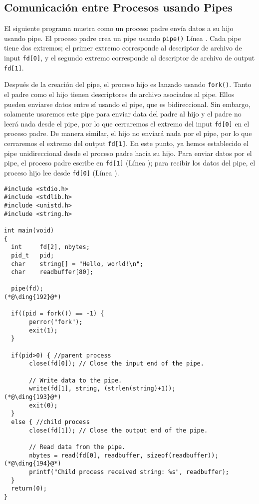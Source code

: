\vspace{0.2in}
\subsection{Comunicación entre Procesos usando Pipes}
\label{vpn:subsec:pipe}

El siguiente programa muetra como un proceso padre envía datos a su hijo usando pipe. El proceso padre crea un pipe usando  \texttt{pipe()} Línea . 
Cada pipe tiene dos extremos; el primer extremo corresponde al descriptor de archivo de input \texttt{fd[0]}, y el segundo extremo corresponde al descriptor de archivo de output \texttt{fd[1]}.

Después de la creación del pipe, el proceso hijo es lanzado usando \texttt{fork()}. 
Tanto el padre como el hijo tienen descriptores de archivo asociados al pipe. Ellos pueden enviarse datos entre sí usando el pipe, que es bidireccional. Sin embargo, solamente usaremos este pipe para enviar data del padre al hijo y el padre no leerá nada desde el pipe, por lo que cerraremos el extremo del input \texttt{fd[0]} en el proceso padre. De manera similar, el hijo no enviará nada por el pipe, por lo que cerraremos el extremo del output \texttt{fd[1]}. 
En este punto, ya hemos establecido el pipe unidireccional desde el proceso padre hacia su hijo.
Para enviar datos por el pipe, el proceso padre escribe en \texttt{fd[1]} (Línea ); para recibir los datos del pipe, el proceso hijo lee desde \texttt{fd[0]} (Línea ).  


\begin{lstlisting}
#include <stdio.h>
#include <stdlib.h>
#include <unistd.h>
#include <string.h>

int main(void)
{
  int     fd[2], nbytes;
  pid_t   pid;
  char    string[] = "Hello, world!\n";
  char    readbuffer[80];

  pipe(fd);                                                  (*@\ding{192}@*)
        
  if((pid = fork()) == -1) {
       perror("fork");
       exit(1);
  }

  if(pid>0) { //parent process 
       close(fd[0]); // Close the input end of the pipe. 

       // Write data to the pipe.
       write(fd[1], string, (strlen(string)+1));             (*@\ding{193}@*)
       exit(0);
  }
  else { //child process
       close(fd[1]); // Close the output end of the pipe.

       // Read data from the pipe.
       nbytes = read(fd[0], readbuffer, sizeof(readbuffer)); (*@\ding{194}@*)
       printf("Child process received string: %s", readbuffer);
  }
  return(0);
}
\end{lstlisting}
 



